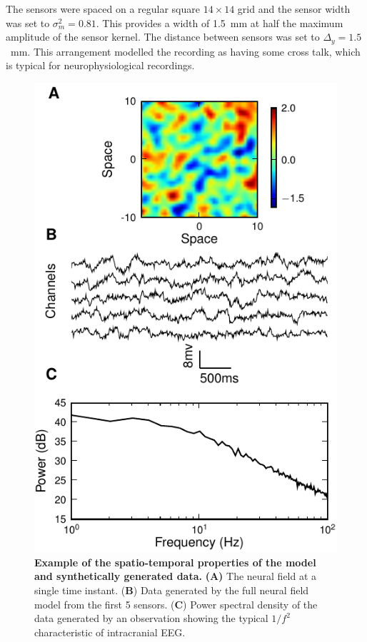 \documentclass[10pt]{article}
\begin{document}
The sensors were spaced on a regular square $14 \times 14$ grid and the sensor width was set to $\sigma^2_m = 0.81$. This provides a width of 1.5~mm at half the maximum amplitude of the sensor kernel. The distance between sensors was set to $\Delta_y = 1.5$~mm. This arrangement modelled the recording as having some cross talk, which is typical for neurophysiological recordings.
 \begin{figure}
    	\begin{center}
     		\includegraphics{./Graph/ExperimentalFigure.pdf}
    	\end{center}
    	\caption{{\bf Example of the spatio-temporal properties of the model and synthetically generated data.} \textbf{(A)} The neural field at a single time instant. (\textbf{B}) Data generated by the full neural field model from the first 5 sensors. (\textbf{C}) Power spectral density of the data generated by an observation showing the typical $1/f^2$ characteristic of intracranial EEG.} 
 \label{fig:experimental design}
 \end{figure}
\end{document}
